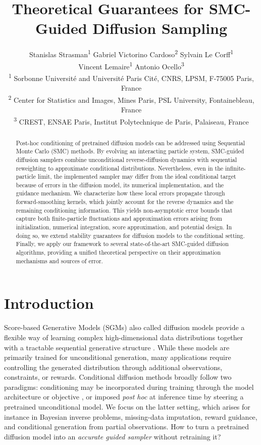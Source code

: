 \documentclass[11pt]{article}
\title{Theoretical Guarantees for SMC-Guided Diffusion Sampling}
\author{%
  Stanislas Strasman\textsuperscript{1} \quad
  Gabriel Victorino Cardoso\textsuperscript{2} \quad
  Sylvain Le Corff\textsuperscript{1} \\
  Vincent Lemaire\textsuperscript{1} \quad
  Antonio Ocello\textsuperscript{3}
  \\[0.75em]
  \textsuperscript{1} Sorbonne Université and Université Paris Cité, CNRS, LPSM, F-75005 Paris, France\\
  \textsuperscript{2} Center for Statistics and Images, Mines Paris, PSL University, Fontainebleau, France\\
  \textsuperscript{3} CREST, ENSAE Paris, Institut Polytechnique de Paris, Palaiseau, France\\
}
\date{} %
\theoremstyle{plain}
\theoremstyle{definition}
\theoremstyle{remark}
\begin{document}
\maketitle


\begin{abstract}

Post-hoc conditioning of pretrained diffusion models can be addressed using Sequential Monte Carlo (SMC) methods. By evolving an interacting particle system, SMC-guided diffusion samplers combine unconditional reverse-diffusion dynamics with sequential reweighting to approximate conditional distributions. Nevertheless, even in the infinite-particle limit, the implemented sampler may differ from the ideal conditional target because of errors in the diffusion model, its numerical implementation, and the guidance mechanism. We characterize how these local errors propagate through forward-smoothing kernels, which jointly account for the reverse dynamics and the remaining conditioning information. This yields non-asymptotic error bounds that capture both finite-particle fluctuations and approximation errors arising from initialization, numerical integration, score approximation, and potential design. In doing so, we extend stability guarantees for diffusion models to the conditional setting. Finally, we apply our framework to several state-of-the-art SMC-guided diffusion algorithms, providing a unified theoretical perspective on their approximation mechanisms and sources of error.

\end{abstract}

 

\section{Introduction}


Score-based Generative Models (SGMs) also called diffusion models provide a flexible way of learning complex high-dimensional data distributions together with a tractable sequential generative structure \citep{dickstein2015,song2019generative,ho2020denoising,song2021score}. While these models are primarily trained for unconditional generation,
many applications require controlling the generated distribution through
additional observations, constraints, or rewards. Conditional diffusion
methods broadly follow two paradigms: conditioning may be incorporated
during training through the model architecture or objective
\citep{ho2021classifierfree,rombach2022highresolution,saharia2022palette},
or imposed \emph{post hoc} at inference time by steering a pretrained
unconditional model. We focus on the latter setting, which arises for
instance in Bayesian inverse problems, missing-data imputation, reward guidance, and
conditional generation from partial observations.
How to turn a pretrained diffusion model into an \emph{accurate guided sampler} without retraining it?
\end{document}
